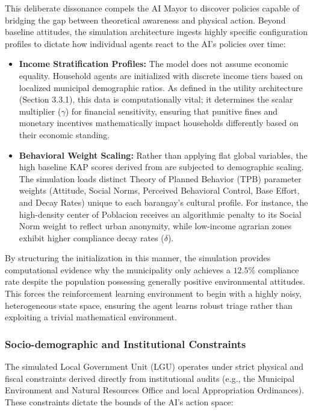 This deliberate dissonance compels the AI Mayor to discover policies capable of bridging the gap between theoretical awareness and physical action. Beyond baseline attitudes, the simulation architecture ingests highly specific configuration profiles to dictate how individual agents react to the AI's policies over time:
\begin{itemize}
    \item \textbf{Income Stratification Profiles:} The model does not assume economic equality. Household agents are initialized with discrete income tiers based on localized municipal demographic ratios. As defined in the utility architecture (Section 3.3.1), this data is computationally vital; it determines the scalar multiplier ($\gamma$) for financial sensitivity, ensuring that punitive fines and monetary incentives mathematically impact households differently based on their economic standing.
    \item \textbf{Behavioral Weight Scaling:} Rather than applying flat global variables, the high baseline KAP scores derived from \cite{Paigalan2025} are subjected to demographic scaling. The simulation loads distinct Theory of Planned Behavior (TPB) parameter weights (Attitude, Social Norms, Perceived Behavioral Control, Base Effort, and Decay Rates) unique to each barangay's cultural profile. For instance, the high-density center of Poblacion receives an algorithmic penalty to its Social Norm weight to reflect urban anonymity, while low-income agrarian zones exhibit higher compliance decay rates ($\delta$). 
\end{itemize}

By structuring the initialization in this manner, the simulation provides computational evidence why the municipality only achieves a $12.5\%$ compliance rate despite the population possessing generally positive environmental attitudes. This forces the reinforcement learning environment to begin with a highly noisy, heterogeneous state space, ensuring the agent learns robust triage rather than exploiting a trivial mathematical environment.

\subsubsection{Socio-demographic and Institutional Constraints}
The simulated Local Government Unit (LGU) operates under strict physical and fiscal constraints derived directly from institutional audits (e.g., the Municipal Environment and Natural Resources Office and local Appropriation Ordinances). These constraints dictate the bounds of the AI's action space:

